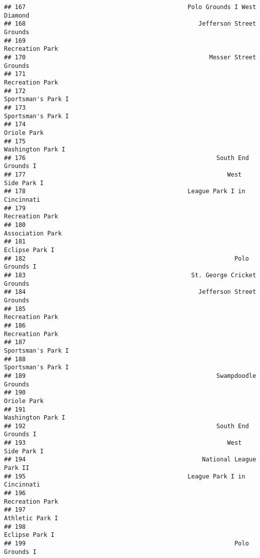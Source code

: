 \documentclass[]{article}
\begin{document}
\begin{verbatim}
## 167                                             Polo Grounds I West Diamond
## 168                                                Jefferson Street Grounds
## 169                                                         Recreation Park
## 170                                                   Messer Street Grounds
## 171                                                         Recreation Park
## 172                                                      Sportsman's Park I
## 173                                                      Sportsman's Park I
## 174                                                             Oriole Park
## 175                                                       Washington Park I
## 176                                                     South End Grounds I
## 177                                                        West Side Park I
## 178                                             League Park I in Cincinnati
## 179                                                         Recreation Park
## 180                                                        Association Park
## 181                                                          Eclipse Park I
## 182                                                          Polo Grounds I
## 183                                              St. George Cricket Grounds
## 184                                                Jefferson Street Grounds
## 185                                                         Recreation Park
## 186                                                         Recreation Park
## 187                                                      Sportsman's Park I
## 188                                                      Sportsman's Park I
## 189                                                     Swampdoodle Grounds
## 190                                                             Oriole Park
## 191                                                       Washington Park I
## 192                                                     South End Grounds I
## 193                                                        West Side Park I
## 194                                                 National League Park II
## 195                                             League Park I in Cincinnati
## 196                                                         Recreation Park
## 197                                                         Athletic Park I
## 198                                                          Eclipse Park I
## 199                                                          Polo Grounds I

\end{verbatim}
\end{document}
